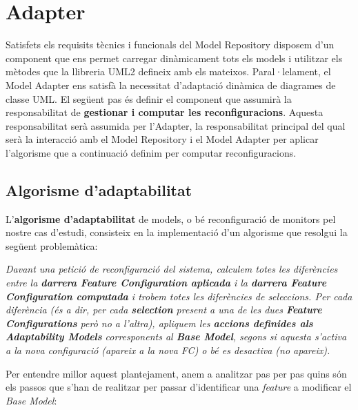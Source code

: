 \section{Adapter}

Satisfets els requisits tècnics i funcionals del Model Repository disposem d'un component que ens permet carregar dinàmicament tots els models i utilitzar els mètodes que la llibreria UML2 defineix amb els mateixos. Paral·lelament, el Model Adapter ens satisfà la necessitat d'adaptació dinàmica de diagrames de classe UML. El següent pas és definir el component que assumirà la responsabilitat de \textbf{gestionar i computar les reconfiguracions}. Aquesta responsabilitat serà assumida per l'Adapter, la responsabilitat principal del qual serà la interacció amb el Model Repository i el Model Adapter per aplicar l'algorisme que a continuació definim per computar reconfiguracions.\\

\subsection{Algorisme d'adaptabilitat}

L'\textbf{algorisme d'adaptabilitat} de models, o bé reconfiguració de monitors pel nostre cas d'estudi, consisteix en la implementació d'un algorisme que resolgui la següent problemàtica:

\begin{center}
\textit{Davant una petició de reconfiguració del sistema, calculem totes les diferències entre la \textbf{darrera Feature Configuration aplicada} i la \textbf{darrera Feature Configuration computada} i trobem totes les diferències de seleccions. Per cada diferència (és a dir, per cada \textbf{selection} present a una de les dues \textbf{Feature Configurations} però no a l'altra), apliquem les \textbf{accions definides als Adaptability Models} corresponents al \textbf{Base Model}, segons si aquesta s'activa a la nova configuració (apareix a la nova FC) o bé es desactiva (no apareix).}
\end{center}

Per entendre millor aquest plantejament, anem a analitzar pas per pas quins són els passos que s'han de realitzar per passar d'identificar una \textit{feature} a modificar el \textit{Base Model}:

